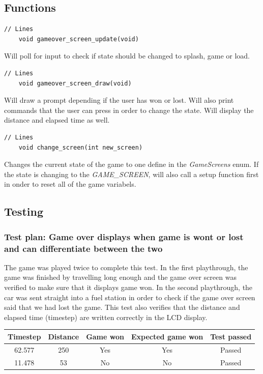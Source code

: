 \documentclass{article}
\begin{document}
\subsection*{Functions}
\begin{lstlisting}[style=CStyle]
	// Lines
	void gameover_screen_update(void)
\end{lstlisting}
Will poll  for input to check if state should be changed to splash, game or load.
\begin{lstlisting}[style=CStyle]
	// Lines
	void gameover_screen_draw(void)
\end{lstlisting}
Will draw a prompt depending if the user has won or lost. Will also print commands that the user can press in order to change the state. Will display the distance and elapsed time as well.
\begin{lstlisting}[style=CStyle]
	// Lines
	void change_screen(int new_screen)
\end{lstlisting}
Changes the current state of the game to one define in the \emph{GameScreens} enum. If the state is changing to the \emph{GAME\_SCREEN}, will also call a setup function first in onder to reset all of the game variabels. 
\newline

\subsection*{Testing}
\subsubsection*{Test plan: Game over displays when game is wont or lost and can differentiate between the two}
The game was played twice to complete this test. In the first playthrough, the game was finished by travelling long enough and the game over screen was verified to make sure that it displays game won. In the second playthrough, the car was sent straight into a fuel station in order to check if the game over screen said that we had lost the game. This test also verifies that the distance and elapsed time (timestep) are written correctly in the LCD display.
\begin{center}
\begin{tabular}{ c c c c c }
Timestep	& Distance	& Game won	& Expected game won	& Test passed	\\ \hline
62.577	& 250		& Yes		& Yes				& Passed		\\
11.478	& 53		& No		& No				& Passed		\\ \hline
\end{tabular}
\end{center}
\end{document}
